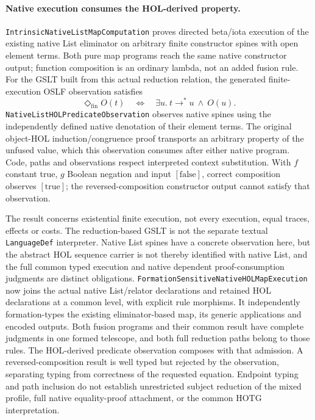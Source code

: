 \documentclass[11pt]{article}
\theoremstyle{definition}
\theoremstyle{remark}
\begin{document}
\paragraph{Native execution consumes the HOL-derived property.}
\nolinkurl{IntrinsicNativeListMapComputation} proves directed beta/iota
execution of the existing native List eliminator on arbitrary finite
constructor spines with open element terms. Both pure map programs reach
the same native constructor output; function composition is an ordinary
lambda, not an added fusion rule. For the GSLT built from this actual
reduction relation, the generated finite-execution OSLF observation satisfies
\[
 \Diamond_{\mathrm{fin}} O(t)
 \quad\Longleftrightarrow\quad
 \exists u.\ t\longrightarrow^{*}u\ \land\ O(u).
\]
\nolinkurl{NativeListHOLPredicateObservation} observes native spines using
the independently defined native denotation of their element terms. The
original object-HOL induction/congruence proof transports an arbitrary
property of the unfused value, which this observation consumes after either
native program. Code, paths and observations respect interpreted context
substitution. With \(f\) constant true, \(g\) Boolean negation and input
\([\mathrm{false}]\), correct composition observes \([\mathrm{true}]\);
the reversed-composition constructor output cannot satisfy that observation.

The result concerns existential finite execution, not every execution,
equal traces, effects or costs. The reduction-based GSLT is not the separate
textual \nolinkurl{LanguageDef} interpreter. Native List spines have a
concrete observation here, but the abstract HOL sequence carrier is not
thereby identified with native List, and the full common typed execution
and native dependent proof-consumption judgments are distinct obligations.
\nolinkurl{FormationSensitiveNativeHOLMapExecution} now joins the actual
native List/relator declarations and retained HOL declarations at a common
level, with explicit rule morphisms. It independently formation-types the
existing eliminator-based map, its generic applications and encoded outputs.
Both fusion programs and their common result have complete judgments in
one formed telescope, and both full reduction paths belong to those rules.
The HOL-derived predicate observation composes with that admission.
A reversed-composition result is well typed but rejected by the observation,
separating typing from correctness of the requested equation. Endpoint
typing and path inclusion do not establish unrestricted subject reduction
of the mixed profile, full native equality-proof attachment, or the common
HOTG interpretation.
\end{document}
